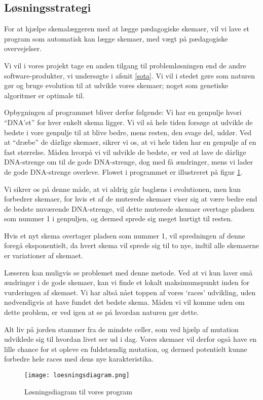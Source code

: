 \subsection{Løsningsstrategi}
For at hjælpe skemalæggeren med at lægge pædagogiske skemaer, vil vi lave et program som automatisk kan lægge skemaer, med vægt på pædagogiske overvejelser.

Vi vil i vores projekt tage en anden tilgang til problemløsningen end de andre software-produkter, vi undersøgte i afsnit \ref{sota}. Vi vil i stedet gøre som naturen gør og bruge evolution til at udvikle vores skemaer; noget som genetiske algoritmer er optimale til.

Opbygningen af programmet bliver derfor følgende: Vi har en genpulje hvori ``DNA'et'' for hver enkelt skema ligger. Vi vil så hele tiden forsøge at udvikle de bedste i vore genpulje til at blive bedre, mens resten, den svage del, uddør. Ved at ``dræbe'' de dårlige skemaer, sikrer vi os, at vi hele tiden har en genpulje af en fast størrelse. Måden hvorpå vi vil udvikle de bedste, er ved at lave de dårlige DNA-strenge om til de gode DNA-strenge, dog med få ændringer, mens vi lader de gode DNA-strenge overleve. Flowet i programmet er illustreret på figur \ref{fig:loesningsdiagram}.

Vi sikrer os på denne måde, at vi aldrig går baglæns i evolutionen, men kun forbedrer skemaer, for hvis et af de muterede skemaer viser sig at være bedre end de bedste nuværende DNA-strenge, vil dette muterede skemaer overtage pladsen som nummer 1 i genpuljen, og dermed sprede sig meget hurtigt til resten.

Hvis et nyt skema overtager pladsen som nummer 1, vil spredningen af denne foregå eksponentielt, da hvert skema vil sprede sig til to nye, indtil alle skemaerne er variationer af skemaet.

Læseren kan muligvis se problemet med denne metode. Ved at vi kun laver små ændringer i de gode skemaer, kan vi finde et lokalt maksimumspunkt inden for vurderingen af skemaet. Vi har altså nået toppen af vores `races' udvikling, uden nødvendigvis at have fundet det bedste skema. Måden vi vil komme uden om dette problem, er ved igen at se på hvordan naturen gør dette.

Alt liv på jorden stammer fra de mindste celler, som ved hjælp af mutation udviklede sig til hvordan livet ser ud i dag. Vores skemaer vil derfor også have en lille chance for st opleve en fuldstændig mutation, og dermed potentielt kunne forbedre hele races med dens nye karakteristika.

\begin{figure}[h!]
	\centering
	\texttt{[image: loesningsdiagram.png]}
	\caption{Løsningsdiagram til vores program}
	\label{fig:loesningsdiagram}
\end{figure}